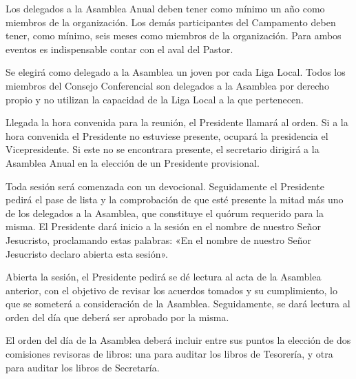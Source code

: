 


\article
\label{participacion-eventos}
Los delegados a la Asamblea Anual deben tener como mínimo un año como miembros de la organización. Los demás participantes del Campamento deben tener, como mínimo, seis meses como miembros de la organización. Para ambos eventos es indispensable contar con el aval del Pastor.

\article
\label{delegados-asamblea}
Se elegirá como delegado a la Asamblea un joven por cada Liga Local. Todos los miembros del Consejo Conferencial son delegados a la Asamblea por derecho propio y no utilizan la capacidad de la Liga Local a la que pertenecen.


\article
\label{eleccion-presidente-sustituto}
Llegada la hora convenida para la reunión, el Presidente llamará al orden. Si a la hora convenida el Presidente no estuviese presente, ocupará la presidencia el Vicepresidente. Si este no se encontrara presente, el secretario dirigirá a la Asamblea Anual en la elección de un Presidente provisional.

\article
Toda sesión será comenzada con un devocional. Seguidamente el Presidente pedirá el pase de lista y la comprobación de que esté presente la mitad más uno de los delegados a la Asamblea, que constituye el quórum requerido para la misma. El Presidente dará inicio a la sesión en el nombre de nuestro Señor Jesucristo, proclamando estas palabras: «En el nombre de nuestro Señor Jesucristo declaro abierta esta sesión».

\article
Abierta la sesión, el Presidente pedirá se dé lectura al acta de la Asamblea anterior, con el objetivo de revisar los acuerdos tomados y su cumplimiento, lo que se someterá a consideración de la Asamblea. Seguidamente, se dará lectura al orden del día que deberá ser aprobado por la misma.

\article
El orden del día de la Asamblea deberá incluir entre sus puntos la elección de dos comisiones revisoras de libros: una para auditar los libros de Tesorería, y otra para auditar los libros de Secretaría.


